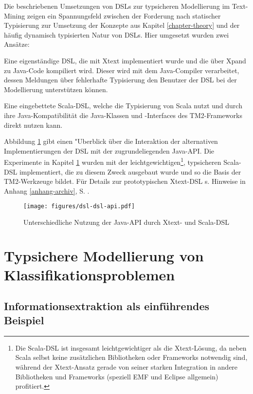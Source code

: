 \documentclass[abstracton, 12pt]{scrartcl}
\begin{document}
Die beschriebenen Umsetzungen von DSLs zur typsicheren Modellierung im Text-Mining zeigen ein Spannungsfeld zwischen der Forderung nach statischer Typisierung zur Umsetzung der Konzepte aus Kapitel \ref{chapter-theory} und der häufig dynamisch typisierten Natur von DSLs. Hier umgesetzt wurden zwei Ansätze: \begin{inparaenum}
\item Eine eigenständige DSL, die mit Xtext implementiert wurde und die über Xpand zu Java-Code kompiliert wird. Dieser wird mit dem Java-Compiler verarbeitet, dessen Meldungen über fehlerhafte Typisierung den Benutzer der DSL bei der Modellierung unterstützen können.
\item Eine eingebettete Scala-DSL, welche die Typisierung von Scala nutzt und durch ihre Java-Kompatibilität die Java-Klassen und -Interfaces des TM2-Frameworks direkt nutzen kann.
\end{inparaenum} 

Abbildung \ref{dsl-dsl-api} gibt einen "Uberblick über die Interaktion der alternativen Implementierungen der DSL mit der zugrundeliegenden Java-API. Die Experimente in Kapitel \ref{chapter-appl} wurden mit der leichtgewichtigen\footnote{Die Scala-DSL ist insgesamt leichtgewichtiger als die Xtext-Lösung, da neben Scala selbst keine zusätzlichen Bibliotheken oder Frameworks notwendig sind, während der Xtext-Ansatz gerade von seiner starken Integration in andere Bibliotheken und Frameworks (speziell EMF und Eclipse allgemein) profitiert.}, typsicheren Scala-DSL implementiert, die zu diesem Zweck ausgebaut wurde und so die Basis der TM2-Werkzeuge bildet. Für Details zur prototypischen Xtext-DSL s. Hinweise in Anhang \ref{anhang-archiv}, S. \pageref{anhang-archiv}.

\begin{figure}
\begin{center}
  \texttt{[image: figures/dsl-dsl-api.pdf]}
  \caption{Unterschiedliche Nutzung der Java-API durch Xtext- und Scala-DSL}
  \label{dsl-dsl-api}
\end{center}
\end{figure}

\section{Typsichere Modellierung von Klassifikationsproblemen} \label{chapter-appl}   

\subsection{Informationsextraktion als einführendes Beispiel} \label{appl-ie}
\end{document}
